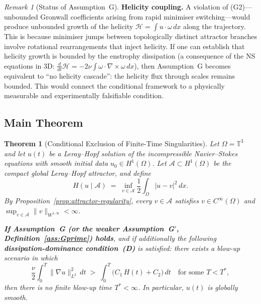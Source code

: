 \documentclass[12pt,a4paper]{article}
\theoremstyle{definition}
\theoremstyle{plain}
\newtheorem{theorem}[definition]{Theorem}
\theoremstyle{remark}
\newtheorem{remark}[definition]{Remark}
\begin{document}
\begin{remark}[Status of Assumption~G]
\medskip\noindent
\textbf{Helicity coupling.}\;
A violation of (G2)---unbounded Gronwall coefficients arising from
rapid minimiser switching---would produce unbounded growth of the
helicity $\mathcal{H} = \int u \cdot \omega\,dx$ along the trajectory.
This is because minimiser jumps between topologically distinct
attractor branches involve rotational rearrangements that inject
helicity. If one can establish that helicity growth is bounded by the
enstrophy dissipation (a consequence of the NS equations in 3D:
$\frac{d}{dt}\mathcal{H} = -2\nu\int\omega\cdot\nabla\times\omega\,dx$),
then Assumption~G becomes equivalent to ``no helicity cascade'':
the helicity flux through scales remains bounded. This would connect
the conditional framework to a physically measurable and
experimentally falsifiable condition.
\end{remark}

\subsection*{Main Theorem}
\begin{theorem}[Conditional Exclusion of Finite-Time Singularities]
\label{thm:main}
Let $\Omega = \mathbb{T}^3$ and let $u(t)$ be a Leray--Hopf solution of the
incompressible Navier--Stokes equations with smooth initial data
$u_0 \in H^1(\Omega)$.  Let $\mathcal{A} \subset H^1(\Omega)$ be the compact global
Leray--Hopf attractor, and define
\[
    H\!\left(u\mid\mathcal{A}\right)
    \;=\; \inf_{v\in\mathcal{A}}\frac{1}{2}\int_\Omega |u-v|^2\,dx.
\]
By Proposition~\ref{prop:attractor-regularity}, every $v \in \mathcal{A}$ satisfies
$v \in C^\infty(\Omega)$ and $\sup_{v\in\mathcal{A}}\|v\|_{W^{1,\infty}} < \infty$.

\textbf{If Assumption~G \textup{(}or the weaker
Assumption~G$'$, Definition~\ref{ass:Gprime}\textup{)} holds},
and if additionally the following \textbf{dissipation-dominance
condition~(D)} is satisfied: there exists a blow-up scenario in which
\begin{equation}\label{eq:diss-dom}
  \frac{\nu}{2}\int_0^T \|\nabla u\|_{L^2}^2\,dt
  \;>\;
  \int_0^T \bigl(C_1\,H(t) + C_2\bigr)\,dt
  \quad \text{for some } T < T^*,
  \tag{D}
\end{equation}
then there is no finite blow-up time $T^* < \infty$.  In particular,
$u(t)$ is globally smooth.
\end{theorem}
\end{document}

